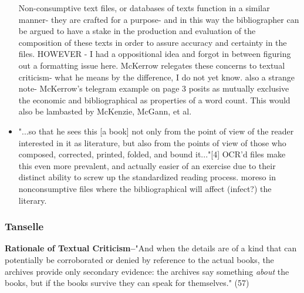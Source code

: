 \documentclass[course, english]{Notes}
\begin{document}
\begin{itemize}
\begin{outline}
\2 Non-consumptive text files, or databases of texts function in a similar manner- they are crafted for a purpose- and in this way the bibliographer can be argued to  have a stake in the production and evaluation of the composition of these texts in order to assure accuracy and certainty in the files. 
\3 HOWEVER - I had a oppositional idea and forgot in between figuring out a formatting issue here.
\3 McKerrow relegates these concerns to textual criticism- what he means by the difference, I do not yet know. 
\3 also a strange note- McKerrow's telegram example on page 3 posits as mutually exclusive the economic and bibliographical as properties of a word count. This would also be lambasted by McKenzie, McGann, et al. 
\end{outline}
\item \begin{outline} \1 "...so that he sees this [a book] not only from the point of view of the reader interested in it as literature, but also from the points of view of those who composed, corrected, printed, folded, and bound it..."[4]
\2 OCR'd files make this even more prevalent, and actually easier of an exercise due to their distinct ability to screw up the standardized reading process. 
\3 moreso in nonconsumptive files where the bibliographical will affect (infect?) the literary.
\end{outline}
\end{itemize}

\subsubsection{Tanselle}
\textbf{Rationale of Textual Criticism--}"And when the details are of a kind that can potentially be corroborated or denied by reference to the actual books, the archives provide only secondary evidence: the archives say something \textit{about} the books, but if the books survive they can speak for themselves." (57)
\end{document}
